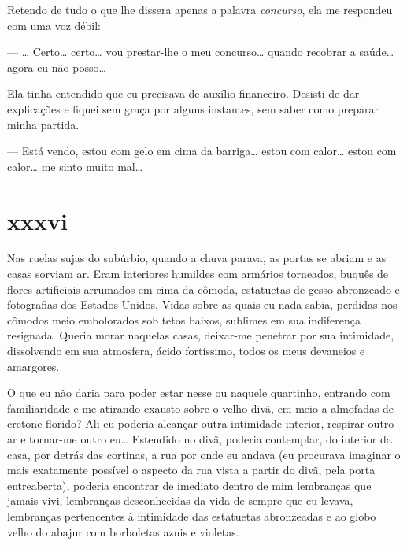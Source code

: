 Retendo de tudo o que lhe dissera apenas a palavra \textit{concurso}, ela me
respondeu com uma voz débil:

--- \ldots{} Certo\ldots{} certo\ldots{} vou prestar-lhe o meu concurso\ldots
     {} quando recobrar a saúde\ldots{} agora eu não posso\ldots{}

Ela tinha entendido que eu precisava de auxílio financeiro. Desisti de dar
explicações e fiquei sem graça por alguns instantes, sem saber como preparar
minha partida.


--- Está vendo, estou com gelo em cima da barriga\ldots{} estou com
    calor\ldots{} estou com calor\ldots{} me sinto muito mal\ldots{}



\section{xxxvi} 


Nas ruelas sujas do subúrbio, quando a chuva parava, as portas se abriam e as
casas sorviam ar. Eram interiores humildes com armários torneados, buquês de
flores artificiais arrumados em cima da cômoda, estatuetas de gesso
abronzeado e fotografias dos Estados Unidos. Vidas sobre as quais eu nada
sabia, perdidas nos cômodos meio embolorados sob tetos baixos, sublimes em
sua indiferença resignada. Queria morar naquelas casas, deixar-me penetrar
por sua intimidade, dissolvendo em sua atmosfera, ácido fortíssimo, todos os
meus devaneios e amargores.

O que eu não daria para poder estar nesse ou naquele quartinho, entrando com
familiaridade e me atirando exausto sobre o velho divã, em meio a almofadas
de cretone florido? Ali eu poderia alcançar outra intimidade interior,
respirar outro ar e tornar-me outro eu\ldots{} Estendido no divã, poderia
contemplar, do interior da casa, por detrás das cortinas, a rua por onde eu
andava (eu procurava imaginar o mais exatamente possível o aspecto da rua
vista a partir do divã, pela porta entreaberta), poderia encontrar de
imediato dentro de mim lembranças que jamais vivi, lembranças desconhecidas
da vida de sempre que eu levava, lembranças pertencentes à intimidade das
estatuetas abronzeadas e ao globo velho do abajur com borboletas azuis e
violetas.

